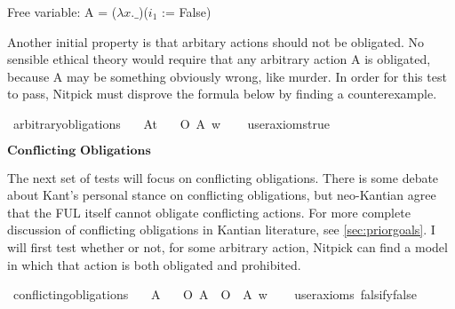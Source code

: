\begin{isabellebody}
{  Free variable:
    A = ($\lambda x. \_$)($i_1$ := False)\color{black}%
}\isanewline
%
%
\endisatagproof
{\isafoldproof}%
%
\isadelimproof
%
\endisadelimproof
%
\begin{isamarkuptext}%
Another initial property is that arbitary actions should not be obligated. No sensible ethical
theory would require that any arbitrary action A is obligated, because A may be something obviously wrong,
like murder. In order for this test to pass, Nitpick must disprove the formula below by finding a counterexample.%
\end{isamarkuptext}\isamarkuptrue%
\isamarkupfalse%
\ arbitrary{\isacharunderscore}obligations{\isacharcolon}\isanewline
\ \ \ A{\isacharcolon}{\isacharcolon}{\isachardoublequoteopen}t{\isachardoublequoteclose}\isanewline
\ \ \ {\isachardoublequoteopen}O\ {\isacharbraceleft}A{\isacharbraceright}\ w{\isachardoublequoteclose}\isanewline
\ \ \isamarkupfalse%
\ {\isacharbrackleft}user{\isacharunderscore}axioms{\isacharequal}true{\isacharbrackright}%
\isadelimproof
\ %
\endisadelimproof
%
\isatagproof
{}\isamarkupfalse%
\isanewline
%
\isanewline
%
%
\endisatagproof
{\isafoldproof}%
%
\isadelimproof
%
\endisadelimproof
%
\begin{isamarkuptext}%
$\textbf{Conflicting Obligations}$%
\end{isamarkuptext}\isamarkuptrue%
%
\begin{isamarkuptext}%
The next set of tests will focus on conflicting obligations. There is some debate about Kant's
personal stance on conflicting obligations, but neo-Kantian agree that the FUL itself cannot obligate
conflicting actions. For more complete discussion of conflicting obligations in Kantian literature, 
see \ref{sec:priorgoals}. I will first test whether or not, for some arbitrary action, Nitpick can find
a model in which that action is both obligated and prohibited.%
\end{isamarkuptext}\isamarkuptrue%
\isamarkupfalse%
\ conflicting{\isacharunderscore}obligations{\isacharcolon}\isanewline
\ \ \ A\isanewline
\ \ \ {\isachardoublequoteopen}{\isacharparenleft}O\ {\isacharbraceleft}A{\isacharbraceright}\ \isactrlbold {\isasymand}\ O\ {\isacharbraceleft}\isactrlbold {\isasymnot}\ A{\isacharbraceright}{\isacharparenright}\ w{\isachardoublequoteclose}\isanewline
\ \ \isamarkupfalse%
\ {\isacharbrackleft}user{\isacharunderscore}axioms{\isacharcomma}\ falsify{\isacharequal}false{\isacharbrackright}%
\isadelimproof
\ %
\endisadelimproof
%
\isatagproof
{}\isamarkupfalse%
\isanewline
%
\end{isabellebody}
